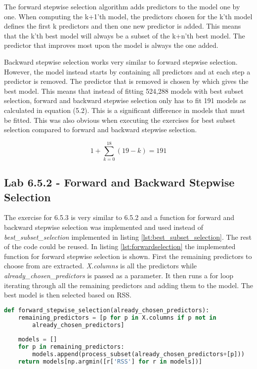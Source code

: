 The forward stepwise selection algorithm adds predictors to the model one by one. When computing the k+1'th model, the predictors chosen for the k'th model defines the first k predictors and then one new predictor is added. This means that the k'th best model will always be a subset of the k+n'th best model. The predictor that improves most upon the model is always the one added.

Backward stepwise selection works very similar to forward stepwise selection. However, the model instead starts by containing all predictors and at each step a predictor is removed. The predictor that is removed is chosen by which gives the best model. This means that instead of fitting 524,288 models with best subset selection, forward and backward stepwise selection only has to fit 191 models as calculated in equation (5.2). This is a significant difference in models that must be fitted.  This was also obvious when executing the exercises for best subset selection compared to forward and backward stepwise selection.

\begin{equation}
1+ \sum_{k=0}^{18}(19-k) = 191
\end{equation}

\subsection{Lab 6.5.2 - Forward and Backward Stepwise Selection}
The exercise for 6.5.3 is very similar to 6.5.2 and a function for forward and backward stepwise selection was implemented and used instead of \emph{best\_subset\_selection} implemented in listing \ref{lst:best_subset_selection}. The rest of the code could be reused. In listing \ref{lst:forwardselection} the implemented function for forward stepwise selection is shown. First the remaining predictors to choose from are extracted. \emph{X.columns} is all the predictors while \emph{already\_chosen\_predictors} is passed as a parameter. It then runs a for loop iterating through all the remaining predictors and adding them to the model. The best model is then selected based on RSS.

\begin{lstlisting}[language=Python, label=lst:forwardselection, caption=Function for forward stepwise selection]
def forward_stepwise_selection(already_chosen_predictors):
	remaining_predictors = [p for p in X.columns if p not in
		already_chosen_predictors]
		
	models = []
	for p in remaining_predictors:
		models.append(process_subset(already_chosen_predictors+[p]))
	return models[np.argmin([r['RSS'] for r in models])]
\end{lstlisting}

